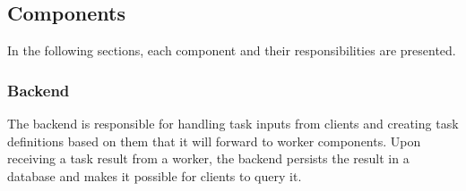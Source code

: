 %	


\subsection{Components}

In the following sections, each component and their responsibilities are presented.

\subsubsection{Backend}

%

The backend is responsible for handling task inputs from clients and creating task definitions based on them that it will forward to worker components. Upon receiving a task result from a worker, the backend persists the result in a database and makes it possible for clients to query it.

